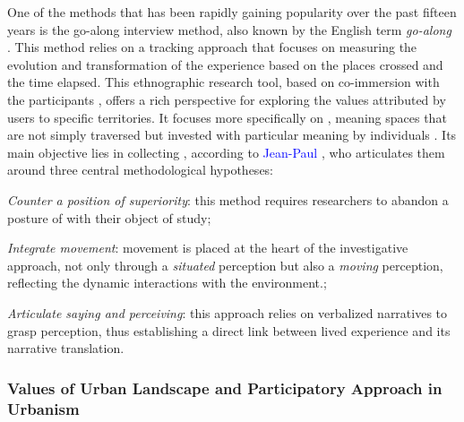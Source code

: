 \begin{refsegment}
One of the  methods that has been rapidly gaining popularity over the past fifteen years is the go-along interview method, also known by the English term \textsl{go-along} \textcolor{blue}{\autocite[3]{despres_replacer_2019}}. This method relies on a tracking approach that focuses on measuring the evolution and transformation of the experience based on the places crossed and the time elapsed. This ethnographic research tool, based on co-immersion with the participants \textcolor{blue}{\autocite[456]{kusenbach_street_2003}}, offers a rich perspective for exploring the values attributed by users to specific territories. It focuses more specifically on , meaning spaces that are not simply traversed but invested with particular meaning by individuals \textcolor{blue}{\autocite[]{fremont_region_1976}}. Its main objective lies in collecting , according to \textcolor{blue}{Jean-Paul} \textcolor{blue}{\textcite[83-85]{thibaud_methode_2001}}, who articulates them around three central methodological hypotheses:
    \begin{customitemize}
\item \textsl{Counter a position of superiority}: this method requires researchers to abandon a posture of  with their object of study;
\item \textsl{Integrate movement}: movement is placed at the heart of the investigative approach, not only through a \textsl{situated} perception but also a \textsl{moving} perception, reflecting the dynamic interactions with the environment.;
\item \textsl{Articulate \textsl{saying} and \textsl{perceiving}}: this approach relies on verbalized narratives to grasp perception, thus establishing a direct link between lived experience and its narrative translation.
    \end{customitemize}%

\subsubsection*{Values of Urban Landscape and Participatory Approach in Urbanism
    \label{chap3:parcours-commente-definition-generale}
    }


\end{refsegment}
